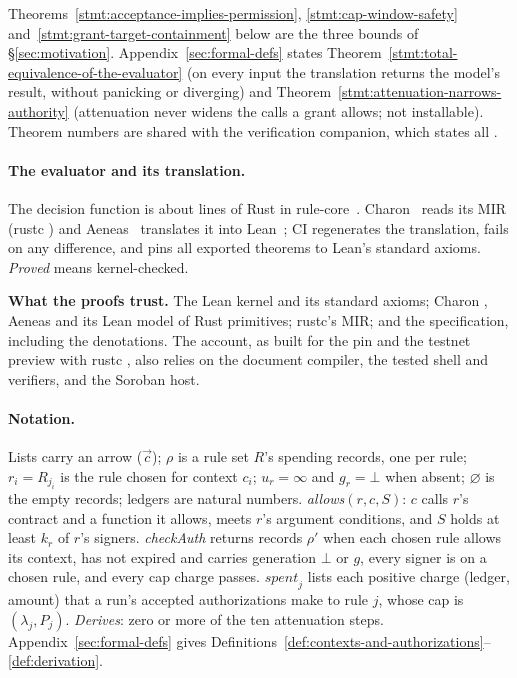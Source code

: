 Theorems~\ref{stmt:acceptance-implies-permission},
\ref{stmt:cap-window-safety} and~\ref{stmt:grant-target-containment} below are
the three bounds of \S\ref{sec:motivation}. Appendix~\ref{sec:formal-defs}
states Theorem~\ref{stmt:total-equivalence-of-the-evaluator} (on every input the
translation returns the model's result, without panicking or diverging) and
Theorem~\ref{stmt:attenuation-narrows-authority} (attenuation never widens the
calls a grant allows; not installable). Theorem numbers are shared with the
verification companion, which states all .

\paragraph{The evaluator and its translation.} The decision function is about
 lines of  Rust in
rule-core~. Charon~\cite{charon} reads its MIR (rustc
) and Aeneas~\cite{aeneas} translates it into
Lean~\cite{lean4}; CI
regenerates the translation, fails on any difference, and pins all
 exported theorems to Lean's standard axioms.
\emph{Proved} means kernel-checked.


\begin{perchbox}
\textbf{What the proofs trust.} The Lean kernel and its standard axioms; Charon
, Aeneas  and its Lean model of Rust
primitives; rustc's MIR; and the specification, including the denotations. The
account, as built for the pin and the testnet preview with rustc
, also relies on the document compiler, the tested shell and
verifiers, and the Soroban host.
\end{perchbox}

\paragraph{Notation.} Lists carry an arrow ($\vec c$); $\rho$ is a rule set
$R$'s spending records, one per rule; $r_i = R_{j_i}$ is the rule chosen for
context $c_i$; $u_r = \infty$ and $g_r = \bot$ when absent; $\varnothing$ is
the empty records; ledgers are natural numbers. \emph{allows}$(r, c, S)$: $c$
calls $r$'s contract and a function it allows, meets $r$'s argument
conditions, and $S$ holds at least $k_r$ of $r$'s signers. \emph{checkAuth}
returns records $\rho'$ when each chosen rule allows its context, has not
expired and carries generation $\bot$ or $g$, every signer is on a chosen
rule, and every cap charge passes. $\mathit{spent}_j$ lists each positive
charge (ledger, amount) that a run's accepted authorizations make to rule $j$,
whose cap is $(\lambda_j, P_j)$. \emph{Derives}: zero or more of the ten
attenuation steps. Appendix~\ref{sec:formal-defs} gives
Definitions~\ref{def:contexts-and-authorizations}--\ref{def:derivation}.




